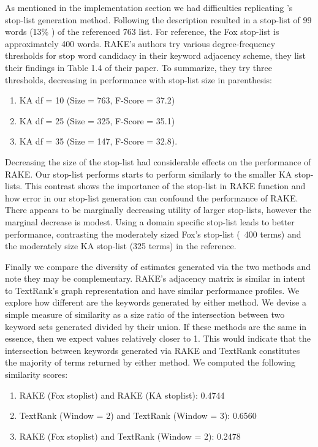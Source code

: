 \documentclass[11pt,a4paper]{article}
\begin{document}
As mentioned in the implementation section we had difficulties replicating \citet{1}'s stop-list generation method. Following the description resulted in a stop-list of 99 words (13\% ) of the referenced 763 list. For reference, the Fox stop-list is approximately 400 words. RAKE's authors try various degree-frequency thresholds for stop word candidacy in their keyword adjacency scheme, they list their findings in Table 1.4 of their paper. To summarize, they try three thresholds, decreasing in performance with stop-list size in parenthesis: 
\begin{enumerate}
	\small \itemsep0em 

	\item KA df = 10 (Size = 763, F-Score = 37.2)
	\item KA df = 25 (Size = 325, F-Score = 35.1)
	\item KA df = 35 (Size = 147, F-Score = 32.8).
	
\normalsize
\end{enumerate}  

Decreasing the size of the stop-list had considerable effects on the performance of RAKE. Our stop-list performs starts to perform similarly to the smaller KA stop-lists.  This contrast shows the importance of the stop-list in RAKE function and how error in our stop-list generation can confound the performance of RAKE. There appears to be marginally decreasing utility of larger stop-lists, however the marginal decrease is modest. Using a domain specific stop-list leads to better performance, contrasting the moderately sized Fox's stop-list (~400 terms) and the moderately size KA stop-list (325 terms) in the reference. 

Finally we compare the diversity of estimates generated via the two methods and note they may be complementary. RAKE's adjacency matrix is similar in intent to TextRank's graph representation and have similar performance profiles. We explore how different are the keywords generated by either method. We devise a simple measure of similarity as a size ratio of the intersection between two keyword sets generated divided by their union. If these methods are the same in essence, then we expect values relatively closer to 1. This would indicate that the intersection between keywords generated via RAKE and TextRank constitutes the majority of terms returned by either method. We computed the following similarity scores:
\begin{enumerate}
	\small \itemsep0em 

	\item RAKE (Fox stoplist) and RAKE (KA stoplist): 0.4744
	\item TextRank (Window = 2) and TextRank (Window = 3):  0.6560
	\item RAKE (Fox stoplist) and TextRank (Window = 2): 0.2478
\normalsize
\end{enumerate}  
\end{document}

